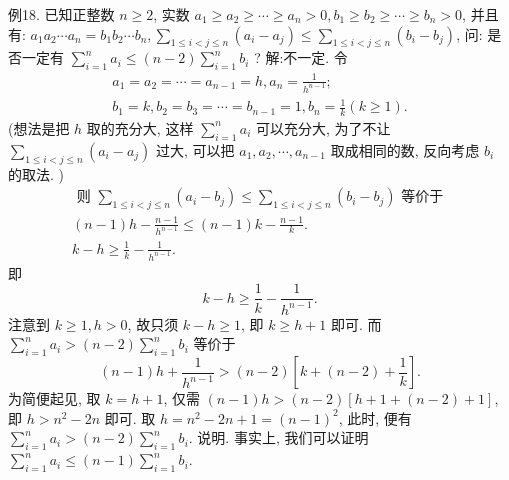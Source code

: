 例18. 已知正整数 $n \geqslant 2$, 实数 $a_1 \geqslant a_2 \geqslant \cdots \geqslant a_n>0, b_1 \geqslant b_2 \geqslant \cdots \geqslant b_n>0$, 并且有: $a_1 a_2 \cdots a_n=b_1 b_2 \cdots b_n, \sum_{1 \leqslant i<j \leqslant n}\left(a_i-a_j\right) \leqslant \sum_{1 \leqslant i<j \leqslant n}\left(b_i-b_j\right)$, 问: 是否一定有 $\sum_{i=1}^n a_i \leqslant(n-2) \sum_{i=1}^n b_i$ ?
解:不一定.
令
$$
\begin{gathered}
a_1=a_2=\cdots=a_{n-1}=h, a_n=\frac{1}{h^{n-1}} ; \\
b_1=k, b_2=b_3=\cdots=b_{n-1}=1, b_n=\frac{1}{k}(k \geqslant 1) .
\end{gathered}
$$
(想法是把 $h$ 取的充分大, 这样 $\sum_{i=1}^n a_i$ 可以充分大, 为了不让 $\sum_{1 \leqslant i<j \leqslant n}\left(a_i-a_j\right)$ 过大, 可以把 $a_1, a_2, \cdots, a_{n-1}$ 取成相同的数, 反向考虑 $b_i$ 的取法.
)
$$
\begin{gathered}
\text { 则 } \sum_{1 \leqslant i<j \leqslant n}\left(a_i-b_j\right) \leqslant \sum_{1 \leqslant i<j \leqslant n}\left(b_i-b_j\right) \text { 等价于 } \\
(n-1) h-\frac{n-1}{h^{n-1}} \leqslant(n-1) k-\frac{n-1}{k} . \\
k-h \geqslant \frac{1}{k}-\frac{1}{h^{n-1}} .
\end{gathered}
$$
即
$$
k-h \geqslant \frac{1}{k}-\frac{1}{h^{n-1}} .
$$
注意到 $k \geqslant 1, h>0$, 故只须 $k-h \geqslant 1$, 即 $k \geqslant h+1$ 即可.
而 $\sum_{i=1}^n a_i>(n-2) \sum_{i=1}^n b_i$ 等价于
$$
(n-1) h+\frac{1}{h^{n-1}}>(n-2)\left[k+(n-2)+\frac{1}{k}\right] .
$$
为简便起见, 取 $k=h+1$, 仅需 $(n-1) h>(n-2)[h+1+(n-2)+1]$, 即 $h>n^2-2 n$ 即可.
取 $h=n^2-2 n+1=(n-1)^2$, 此时, 便有 $\sum_{i=1}^n a_i> (n-2) \sum_{i=1}^n b_i$.
说明.
事实上, 我们可以证明 $\sum_{i=1}^n a_i \leqslant(n-1) \sum_{i=1}^n b_i$.


